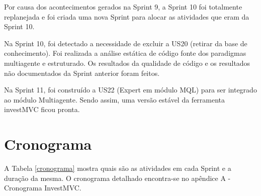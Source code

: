 Por causa dos acontecimentos gerados na Sprint 9, a Sprint 10 foi totalmente replanejada e foi criada uma nova Sprint para alocar as atividades que eram da Sprint 10.

Na Sprint 10, foi detectado a necessidade de excluir a US20 (retirar da base de conhecimento). Foi realizada a análise estática de código fonte dos paradigmas multiagente e estruturado. Os resultados da qualidade de código e os resultados não documentados da Sprint anterior foram feitos.

Na Sprint 11, foi construído a US22 (Expert em módulo MQL) para ser integrado ao módulo Multiagente. Sendo assim, uma versão estável da ferramenta investMVC ficou pronta.

\section{Cronograma}

A Tabela \ref{cronograma} mostra quais são as atividades em cada Sprint e a duração da mesma. O cronograma detalhado encontra-se no apêndice A - Cronograma InvestMVC.

